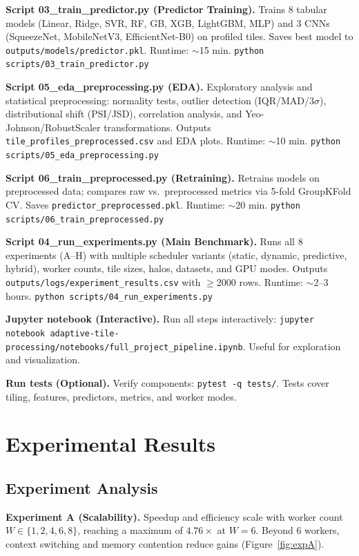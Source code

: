 \documentclass[acmsmall]{acmart}
\begin{document}
\textbf{Script 03\_train\_predictor.py (Predictor Training).} Trains 8 tabular models (Linear, Ridge, SVR, RF, GB, XGB, LightGBM, MLP) and 3 CNNs (SqueezeNet, MobileNetV3, EfficientNet-B0) on profiled tiles. Saves best model to \verb|outputs/models/predictor.pkl|. Runtime: $\sim$15 min. \verb|python scripts/03_train_predictor.py|

\textbf{Script 05\_eda\_preprocessing.py (EDA).} Exploratory analysis and statistical preprocessing: normality tests, outlier detection (IQR/MAD/3$\sigma$), distributional shift (PSI/JSD), correlation analysis, and Yeo-Johnson/RobustScaler transformations. Outputs \verb|tile_profiles_preprocessed.csv| and EDA plots. Runtime: $\sim$10 min. \verb|python scripts/05_eda_preprocessing.py|

\textbf{Script 06\_train\_preprocessed.py (Retraining).} Retrains models on preprocessed data; compares raw vs.~preprocessed metrics via 5-fold GroupKFold CV. Saves \verb|predictor_preprocessed.pkl|. Runtime: $\sim$20 min. \verb|python scripts/06_train_preprocessed.py|

\textbf{Script 04\_run\_experiments.py (Main Benchmark).} Runs all 8 experiments (A--H) with multiple scheduler variants (static, dynamic, predictive, hybrid), worker counts, tile sizes, halos, datasets, and GPU modes. Outputs \verb|outputs/logs/experiment_results.csv| with $\geq$2000 rows. Runtime: $\sim$2--3 hours. \verb|python scripts/04_run_experiments.py|

\textbf{Jupyter notebook (Interactive).} Run all steps interactively: \verb|jupyter notebook adaptive-tile-processing/notebooks/full_project_pipeline.ipynb|. Useful for exploration and visualization.

\textbf{Run tests (Optional).} Verify components: \verb|pytest -q tests/|. Tests cover tiling, features, predictors, metrics, and worker modes.

\section{Experimental Results}\label{sec:results}

\subsection{Experiment Analysis}

\textbf{Experiment A (Scalability).} Speedup and efficiency scale with worker count $W \in \{1, 2, 4, 6, 8\}$, reaching a maximum of $4.76\times$ at $W = 6$. Beyond 6 workers, context switching and memory contention reduce gains (Figure~\ref{fig:expA}).
\end{document}
